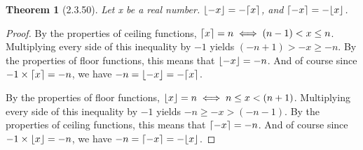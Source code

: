 \documentclass[a4paper, 12pt]{article}
\theoremstyle{plain}
\newtheorem*{theorem*}{Theorem}
\DeclarePairedDelimiter{\floor}{\lfloor}{\rfloor}
\DeclarePairedDelimiter{\ceil}{\lceil}{\rceil}
\begin{document}
	
	\begin{theorem*}[2.3.50]
		Let x be a real number. \newline $\floor{-x} = -\ceil{x}$, and $\ceil{-x} = -\floor{x}$.
	\end{theorem*}
	
	\begin{proof}
		By the properties of ceiling functions, \newline $\ceil{x} = n \iff (n-1) < x \le n$. 
		Multiplying every side of this inequality by $-1$ yields $(-n + 1) > -x \ge -n$. By the 
		properties of floor functions, this means that $\floor{-x} = -n$. And of course since 
		$-1 \times \ceil{x} = -n$, we have $-n = \floor{-x} = -\ceil{x}$.
		
		By the properties of floor functions, \newline $\floor{x} = n \iff n \le x < (n+1)$. 
		Multiplying every side of this inequality by $-1$ yields $-n \ge -x > (-n-1)$. By the 
		properties of ceiling functions, this means that $\ceil{-x} = -n$. And of course since 
		$-1 \times \floor{x} = -n$, we have $-n = \ceil{-x} = -\floor{x}$.
	\end{proof}
\end{document}

